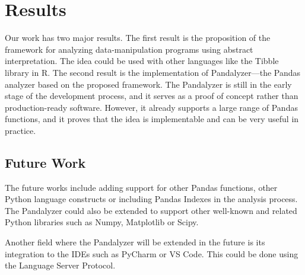\section{Results}

Our work has two major results.
The first result is the proposition of the framework for analyzing data-manipulation programs using abstract
interpretation.
The idea could be used with other languages like the Tibble library in R\@.
The second result is the implementation of Pandalyzer---the Pandas analyzer based on the proposed framework.
The Pandalyzer is still in the early stage of the development process, and it serves as a proof of concept rather
than production-ready software.
However, it already supports a large range of Pandas functions, and it proves that the idea is implementable and can be
very useful in practice.

\subsection{Future Work}

The future works include adding support for other Pandas functions, other Python language constructs or including
Pandas Indexes in the analysis process.
The Pandalyzer could also be extended to support other well-known and related Python libraries such as Numpy,
Matplotlib or Scipy.

Another field where the Pandalyzer will be extended in the future is its integration to the IDEs such as PyCharm or
VS Code.
This could be done using the Language Server Protocol.
